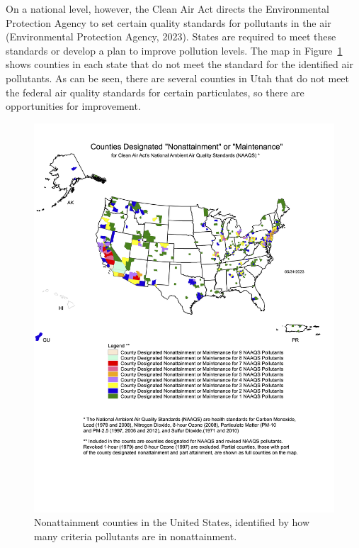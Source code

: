 \documentclass[
  letterpaper,
  DIV=11,
  numbers=noendperiod]{scrreport}
\begin{document}
On a national level, however, the Clean Air Act directs the
Environmental Protection Agency to set certain quality standards for
pollutants in the air (Environmental Protection Agency, 2023). States
are required to meet these standards or develop a plan to improve
pollution levels. The map in Figure~\ref{fig-nonattainment} shows
counties in each state that do not meet the standard for the identified
air pollutants. As can be seen, there are several counties in Utah that
do not meet the federal air quality standards for certain particulates,
so there are opportunities for improvement.

\begin{figure}[t]

{\centering \includegraphics[width=6in,height=\textheight]{images/mapnmpoll.png}

}

\caption{\label{fig-nonattainment}Nonattainment counties in the United
States, identified by how many criteria pollutants are in
nonattainment.}

\end{figure}
\end{document}
